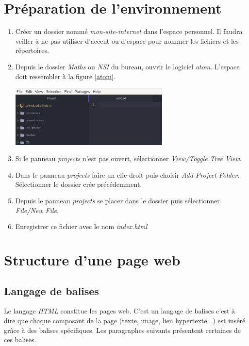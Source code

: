 \documentclass[a4paper,11pt]{article}
\begin{document}
\begin{Form}
\section{Préparation de l'environnement}
\begin{activite}
\begin{enumerate}
\item Créer un dossier nommé \emph{mon-site-internet} dans l'espace personnel. Il faudra veiller à ne pas utiliser d'accent ou d'espace pour nommer les fichiers et les répertoires.
\item Depuis le dossier \emph{Maths} ou \emph{NSI} du bureau, ouvrir le logiciel \emph{atom}. L'espace doit ressembler à la figure \ref{atom}.
\begin{center}
\includegraphics[width=8cm]{ressources/atom.png}
\label{atom}
\end{center}
\item Si le panneau \emph{projects} n'est pas ouvert, sélectionner \emph{View/Toggle Tree View}.
\item Dans le panneau \emph{projects} faire un clic-droit puis choisir \emph{Add Project Folder}. Sélectionner le dossier crée précédemment.
\item Depuis le panneau \emph{projects} se placer dans le dossier puis sélectionner \emph{File/New File}.
\item Enregistrer ce fichier avec le nom \emph{index.html}
\end{enumerate}
\end{activite}

\section{Structure d'une page web}
\subsection{Langage de balises}
Le langage \emph{HTML} constitue les pages web. C'est un langage de balises c'est à dire que chaque composant de la page (texte, image, lien hypertexte...) est inséré grâce à des balises spécifiques. Les paragraphes suivants présentent certaines de ces balises.

\end{Form}
\end{document}
